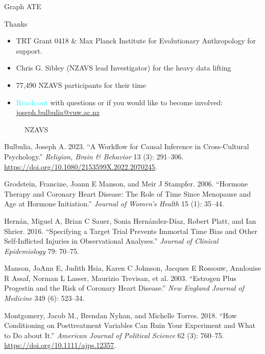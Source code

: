 \documentclass[
  ignorenonframetext,
  aspectratio=169,
]{beamer}
\makeatletter
\newcommand*\pandocbounded[1]{%
  \sbox\pandoc@box{#1}%
  \Gscale@div\@tempa{\textheight}{\dimexpr\ht\pandoc@box+\dp\pandoc@box\relax}%
  \Gscale@div\@tempb{\linewidth}{\wd\pandoc@box}%
  \ifdim\@tempb\p@<\@tempa\p@\let\@tempa\@tempb\fi%
  \ifdim\@tempa\p@<\p@\scalebox{\@tempa}{\usebox\pandoc@box}%
  \else\usebox{\pandoc@box}%
  \fi%
}
\newlength{\cslhangindent}
\newenvironment{CSLReferences}[2] %
 {\begin{list}{}{%
  \setlength{\itemindent}{0pt}
  \setlength{\leftmargin}{0pt}
  \setlength{\parsep}{0pt}
  \ifodd #1
   \setlength{\leftmargin}{\cslhangindent}
   \setlength{\itemindent}{-1\cslhangindent}
  \fi
  \setlength{\itemsep}{#2\baselineskip}}}
 {\end{list}}
\providecommand{\tightlist}{%
  \setlength{\itemsep}{0pt}\setlength{\parskip}{0pt}}
\makeatother
\begin{document}
\begin{frame}{Graph ATE}
\begin{block}{Thanks}
\label{thanks}
\begin{itemize}
\tightlist
\item
  TRT Grant 0418 \& Max Planck Institute for Evolutionary Anthropology
  for support.
\item
  Chris G. Sibley (NZAVS lead Investigator) for the heavy data lifting
\item
  77,490 NZAVS participants for their time
\item
  \textcolor{cyan}{Reach out} with questions or if you would like to
  become involved:
  \href{emailto:joseph.bulbulia@vuw.ac.nz}{joseph.bulbulia@vuw.ac.nz}
\end{itemize}
\end{block}
\end{frame}

\begin{frame}
\begin{figure}[H]

{\centering \pandocbounded{\texttt{[image: NZAVS-QR.png]}}

}

\caption{NZAVS}

\end{figure}%

\begin{block}{}
\label{section-1}
\label{refs}
\begin{CSLReferences}{1}{0}
Bulbulia, Joseph A. 2023. {``A Workflow for Causal Inference in
Cross-Cultural Psychology.''} \emph{Religion, Brain \& Behavior} 13 (3):
291--306. \url{https://doi.org/10.1080/2153599X.2022.2070245}.

Grodstein, Francine, Joann E Manson, and Meir J Stampfer. 2006.
{``Hormone Therapy and Coronary Heart Disease: The Role of Time Since
Menopause and Age at Hormone Initiation.''} \emph{Journal of Women's
Health} 15 (1): 35--44.

Hernán, Miguel A, Brian C Sauer, Sonia Hernández-Díaz, Robert Platt, and
Ian Shrier. 2016. {``Specifying a Target Trial Prevents Immortal Time
Bias and Other Self-Inflicted Injuries in Observational Analyses.''}
\emph{Journal of Clinical Epidemiology} 79: 70--75.

Manson, JoAnn E, Judith Hsia, Karen C Johnson, Jacques E Rossouw,
Annlouise R Assaf, Norman L Lasser, Maurizio Trevisan, et al. 2003.
{``Estrogen Plus Progestin and the Risk of Coronary Heart Disease.''}
\emph{New England Journal of Medicine} 349 (6): 523--34.

Montgomery, Jacob M., Brendan Nyhan, and Michelle Torres. 2018. {``How
Conditioning on Posttreatment Variables Can Ruin Your Experiment and
What to Do about It.''} \emph{American Journal of Political Science} 62
(3): 760--75. \url{https://doi.org/10.1111/ajps.12357}.

\end{CSLReferences}
\end{block}
\end{frame}
\end{document}
